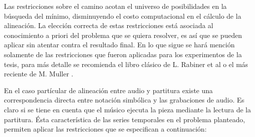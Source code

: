 \documentclass
  [ams,pdfout]%
	{aeslac}
\begin{document}
Las restricciones sobre el camino acotan el universo de posibilidades en la búsqueda del mínimo, disminuyendo el costo computacional en el cálculo de la alineación. La elección correcta de estas restricciones está asociada al conocimiento a priori del problema que se quiera resolver, es así que se pueden aplicar sin atentar contra el resultado final. En lo que sigue se hará mención solamente de las restricciones que fueron aplicadas para los experimentos de la tesis, para más detalle se recomienda el libro clásico de L. Rabiner et al \cite{rabiner1993fundamentals} o el más reciente de M. Muller \cite{muller2007information}.
  
En el caso partícular de alineación entre audio y partitura existe una correspondencia directa entre notación simbólica y las grabaciones de audio. Es claro si se tiene en cuenta que el músico ejecuta la pieza mediante la lectura de la partitura. Ésta característica de las series temporales en el problema planteado, permiten aplicar las restricciones que se especifican a continuación:
\end{document}
